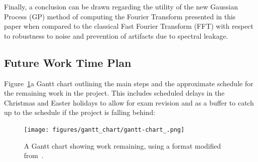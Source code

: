 \documentclass[12pt]{article}
\begin{document}
    Finally, a conclusion can be drawn regarding the utility of the new Gaussian Process (GP) method of computing the Fourier Transform presented in this paper when compared to the classical Fast Fourier Transform (FFT) with respect to robustness to noise and prevention of artifacts due to spectral leakage.

    \subsection{Future Work Time Plan}
    Figure~\ref{fig:gantt-chart_}a Gantt chart outlining the main steps and the approximate schedule for the remaining work in the project.
    This includes scheduled delays in the Christmas and Easter holidays to allow for exam revision and as a buffer to catch up to the schedule if the project is falling behind:

    \begin{landscape}
        \begin{figure}[p] %
            \centering
            \texttt{[image: figures/gantt\_chart/gantt-chart\_.png]}
            \caption{A Gantt chart showing work remaining, using a format modified from~\cite{DataCampGanttChart2021}.}
            \label{fig:gantt-chart_}
        \end{figure}
    \end{landscape}
\end{document}
